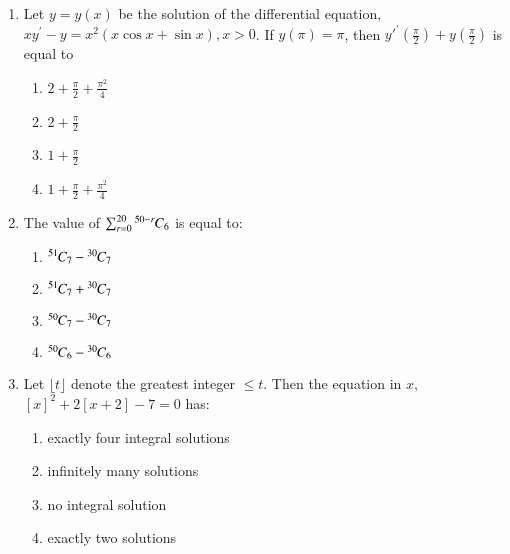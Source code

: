 \documentclass[journal,12pt,twocolumn]{IEEEtran}
\theoremstyle{remark}
\begin{document}
\begin{enumerate}

\item Let \(y=y(x)\) be the solution of the differential equation, \(xy^\prime-y=x^2(x\cos x+\sin x),x>0\). If \(y(\pi)=\pi\), then \(y'^\prime(\frac{\pi}{2})+y(\frac{\pi}{2})\) is equal to
    \begin{multicols}{2}
    \begin{enumerate}
        \item \( 2+\frac{\pi}{2}+\frac{\pi^2}{4} \)
        \item \( 2+\frac{\pi}{2} \)
        \item \( 1+\frac{\pi}{2} \)
        \item \( 
        1+
        \frac{\pi}{2}+\frac{\pi^2}{4} \)
    \end{enumerate}
    \end{multicols}
    
    \item The value of \( \sum_{r=0}^{20} {{}^{50-r}\mkern-1muC_{6}}\) is equal to:
    \begin{multicols}{2}
    \begin{enumerate}
        \item \( {{}^{51}\mkern-1muC_{7}}-{{}^{30}\mkern-1muC_{7}} \)
        \item \( {{}^{51}\mkern-1muC_{7}}+{{}^{30}\mkern-1muC_{7}} \)
        \item \( {{}^{50}\mkern-1muC_{7}}-{{}^{30}\mkern-1muC_{7}} \)
        \item \( {{}^{50}\mkern-1muC_{6}}-{{}^{30}\mkern-1muC_{6}} \)
    \end{enumerate}
    \end{multicols}

    \item Let \(\lfloor t\rfloor\) denote the greatest integer \(\leq t\). Then the equation in $x$,$[x]^2+2[x+2]-7=0$ has:
    \begin{multicols}{2}
    \begin{enumerate}
        \item exactly four integral solutions
        \item infinitely many solutions
        \item no integral solution
        \item exactly two solutions
    \end{enumerate}
    \end{multicols}


\end{enumerate}
\end{document}
